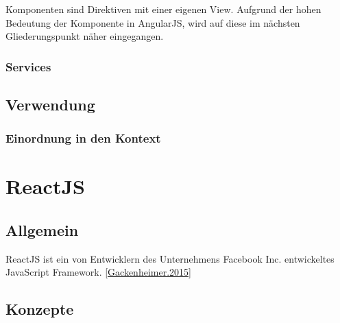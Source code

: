Komponenten sind Direktiven mit einer eigenen View. \autocites[vgl.][265]{Steyer.2017}[vgl.][401]{Freeman.2018} Aufgrund der hohen Bedeutung der Komponente in AngularJS, wird auf diese im nächsten Gliederungspunkt näher eingegangen.

\subsubsection{Services}







\subsection{Verwendung}

\subsubsection{Einordnung in den Kontext}


\section{ReactJS}

\subsection{Allgemein}


ReactJS ist ein von Entwicklern des Unternehmens Facebook Inc. entwickeltes JavaScript Framework. \autoref{Gackenheimer.2015} 


%



\subsection{Konzepte}

